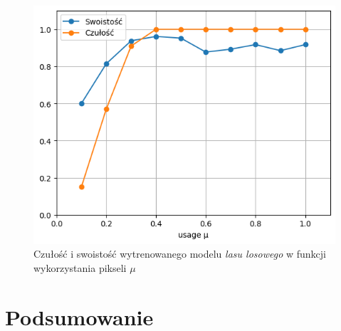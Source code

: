 \documentclass[a4paper,12pt]{article}
\begin{document}
    \begin{figure}[H]
        \centering
        \includegraphics[width=0.5\linewidth]{img/metrics.png}
        \caption{Czułość i swoistość wytrenowanego modelu \textit{lasu losowego} w funkcji wykorzystania pikseli $\mu$}
        \label{fig:metrics}
    \end{figure}
    
\section{Podsumowanie}

\printbibliography[title={Źródła}] %
\end{document}
